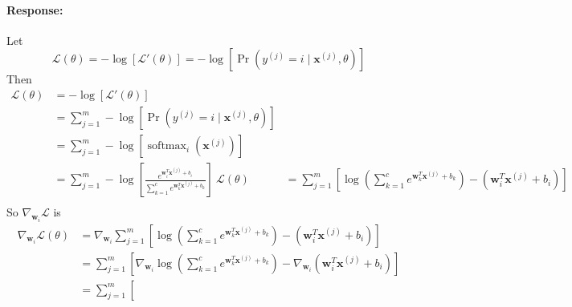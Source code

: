 \documentclass{article}
\newcommand{\x}{\bf{x}}
\newcommand{\w}{\bf{w}}
\newenvironment{response}{\begin{responseframe}\vspace{-10pt}\paragraph{Response:}}{\end{responseframe}}
\DeclareMathOperator{\sm}{softmax}
\renewcommand{\bf}[1]{\textbf{{#1}}}
\begin{document}
\begin{enumerate}
            \begin{response}
                Let
                \[
                    \mathcal{L} (\theta)
                    = -\log[\mathcal{L}' (\theta)] 
                    =
                    -\log
                    \left[
                        \Pr \left( y^{(j)} = i \mid \x^{(j)}, \theta \right) 
                    \right]
                \]
                Then
                \begin{align*}
                    \mathcal{L} (\theta) 
                    &= -\log[\mathcal{L}' (\theta)] \\
                    &= \sum^{m}_{j = 1} -\log \left[ \Pr \left( y^{(j)} = i \mid \x^{(j)}, \theta \right) \right] \\
                    &= \sum^{m}_{j = 1} -\log [\sm_i(\x^{(j)})] \\
                    &= \sum^{m}_{j = 1} 
                    -\log 
                    \left[  
                        \frac{e^{\w^{T}_{i} \x^{(j)} + b_i}}{\sum^{c}_{k = 1} e^{\w^{T}_{k} \x^{(j)} + b_k}}
                    \right] \
                    \mathcal{L} (\theta)
                    &= \sum^{m}_{j = 1}
                    \left[  
                        \log \left( \sum^{c}_{k = 1} e^{\w^{T}_{k} \x^{(j)} + b_k} \right)
                        - 
                        \left( \w^{T}_{i} \x^{(j)} + b_i \right)
                    \right] \\
                \end{align*}
                So $\nabla_{\w_i} \mathcal{L}$ is
                \begin{align*}
                    \nabla_{\w_i} \mathcal{L} (\theta)
                    &= 
                    \nabla_{\w_i}
                    \sum^{m}_{j = 1}
                    \left[  
                        \log \left( \sum^{c}_{k = 1} e^{\w^{T}_{k} \x^{(j)} + b_k} \right)
                        - 
                        \left( \w^{T}_{i} \x^{(j)} + b_i \right)
                    \right] \\
                    &= 
                    \sum^{m}_{j = 1}
                    \left[  
                        \nabla_{\w_i}
                        \log \left( \sum^{c}_{k = 1} e^{\w^{T}_{k} \x^{(j)} + b_k} \right)
                        - 
                        \nabla_{\w_i}
                        \left( \w^{T}_{i} \x^{(j)} + b_i \right)
                    \right] \\
                    &= 
                    \sum^{m}_{j = 1}
                    \left[  

\end{align*}
\end{response}
\end{enumerate}
\end{document}
